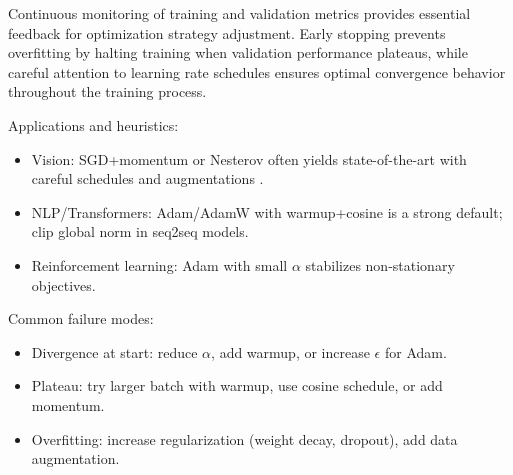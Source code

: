 Continuous monitoring of training and validation metrics provides essential feedback for optimization strategy adjustment. Early stopping prevents overfitting by halting training when validation performance plateaus, while careful attention to learning rate schedules ensures optimal convergence behavior throughout the training process.

Applications and heuristics:
\begin{itemize}
    \item Vision: SGD+momentum or Nesterov often yields state-of-the-art with careful schedules and augmentations \cite{He2016}.
    \item NLP/Transformers: Adam/AdamW with warmup+cosine is a strong default; clip global norm in seq2seq models.
    \item Reinforcement learning: Adam with small $\alpha$ stabilizes non-stationary objectives.
\end{itemize}

Common failure modes:
\begin{itemize}
    \item Divergence at start: reduce $\alpha$, add warmup, or increase \(\epsilon\) for Adam.
    \item Plateau: try larger batch with warmup, use cosine schedule, or add momentum.
    \item Overfitting: increase regularization (weight decay, dropout), add data augmentation.
\end{itemize}
